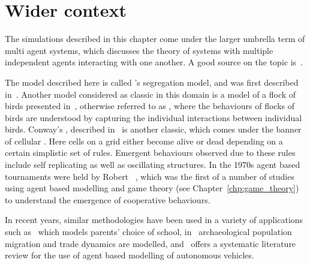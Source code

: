 \section{Wider context}\label{sec:agent_based_simulation_wider_context}

The simulations described in this chapter come under the larger umbrella term of
multi agent systems, which discusses the theory of systems with multiple
independent agents interacting with one another. A good source on the topic
is~\cite{shoham2008multiagent}.

The model described here is called 's segregation model, and was
first described in~\cite{schelling2006micromotives}. Another model
considered as classic in this domain is a model of a flock of birds presented
in~\cite{reynolds1987flocks}, otherwise referred to as , where the
behaviours of flocks of birds are understood by capturing the individual
interactions between individual birds. Conway's , described
in~\cite{gardener1970mathematical} is another classic, which comes under
the banner of cellular . Here cells on a grid either become alive or dead
depending on a certain simplistic set of rules. Emergent behaviours observed due
to these rules include self replicating as well as oscillating structures.
In the 1970s agent based tournaments were held by Robert
~\cite{axelrod1990evolution},
which was the first of a number of studies
using agent based modelling and game theory (see Chapter~\ref{chp:game_theory}) to understand the
emergence of cooperative behaviours.

In recent years, similar methodologies have been used in a variety of
applications such as~\cite{diaz2021agent} which models parents' choice of school,
in~\cite{romanowska2019agent} archaeological population migration and trade
dynamics are modelled, and~\cite{jing2020agent} offers a systematic
literature review for the use of agent based modelling of autonomous vehicles.

